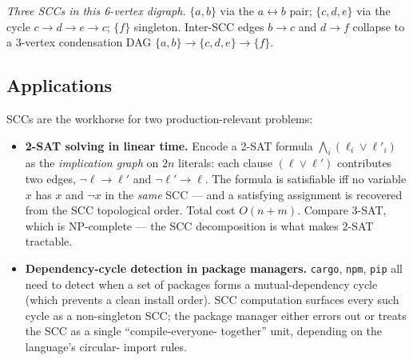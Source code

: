 \documentclass[11pt]{article}
\begin{document}
\begin{center}

\medskip
\emph{Three SCCs in this 6-vertex digraph.} $\{a, b\}$ via the
$a \leftrightarrow b$ pair; $\{c, d, e\}$ via the cycle
$c \to d \to e \to c$; $\{f\}$ singleton. Inter-SCC edges
$b \to c$ and $d \to f$ collapse to a 3-vertex condensation DAG
$\{a,b\} \to \{c,d,e\} \to \{f\}$.

\smallskip
{}
\end{center}

\subsection*{Applications}

SCCs are the workhorse for two production-relevant problems:

\begin{itemize}[leftmargin=*]
    \item \textbf{2-SAT solving in linear time.} Encode a 2-SAT
          formula $\bigwedge_i (\ell_i \vee \ell'_i)$ as the
          \emph{implication graph} on $2n$ literals: each clause
          $(\ell \vee \ell')$ contributes two edges,
          $\neg \ell \to \ell'$ and $\neg \ell' \to \ell$.
          The formula is satisfiable iff no variable $x$ has $x$
          and $\neg x$ in the \emph{same} SCC --- and a satisfying
          assignment is recovered from the SCC topological order.
          Total cost $O(n + m)$. Compare 3-SAT, which is
          NP-complete --- the SCC decomposition is what makes
          2-SAT tractable.
    \item \textbf{Dependency-cycle detection in package
          managers.} \texttt{cargo}, \texttt{npm}, \texttt{pip}
          all need to detect when a set of packages forms a
          mutual-dependency cycle (which prevents a clean install
          order). SCC computation surfaces every such cycle as a
          non-singleton SCC; the package manager either errors
          out or treats the SCC as a single ``compile-everyone-
          together'' unit, depending on the language's circular-
          import rules.
\end{itemize}
\end{document}
